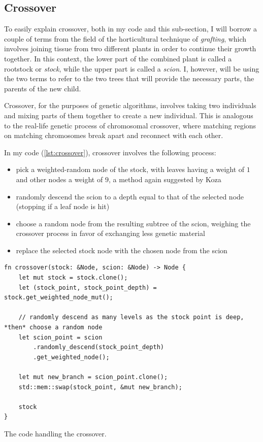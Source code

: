 \documentclass{report}
\newenvironment{code}{\captionsetup{type=listing}}{}
\begin{document}
\subsection{Crossover}

To easily explain crossover, both in my code and this sub-section, I will borrow a couple of terms from the field of the horticultural technique of \emph{grafting}, which involves joining tissue from two different plants in order to continue their growth together. In this context, the lower part of the combined plant is called a rootstock or \emph{stock}, while the upper part is called a \emph{scion}. I, however, will be using the two terms to refer to the two trees that will provide the necessary parts, the parents of the new child.

Crossover, for the purposes of genetic algorithms, involves taking two individuals and mixing parts of them together to create a new individual. This is analogous to the real-life genetic process of chromosomal crossover, where matching regions on matching chromosomes break apart and reconnect with each other.

In my code (\autoref{lst:crossover}), crossover involves the following process:
\begin{itemize}
    \label{weighted_random}
    \item pick a weighted-random node of the stock, with leaves having a weight of $1$ and other nodes a weight of $9$, a method again suggested by Koza\cite{koza}
    \item randomly descend the scion to a depth equal to that of the selected node (stopping if a leaf node is hit)
    \item choose a random node from the resulting subtree of the scion, weighing the crossover process in favor of exchanging less genetic material
    \item replace the selected stock node with the chosen node from the scion
\end{itemize}

\begin{code}
    \begin{verbatim}
fn crossover(stock: &Node, scion: &Node) -> Node {
    let mut stock = stock.clone();
    let (stock_point, stock_point_depth) = stock.get_weighted_node_mut();

    // randomly descend as many levels as the stock point is deep, *then* choose a random node
    let scion_point = scion
        .randomly_descend(stock_point_depth)
        .get_weighted_node();

    let mut new_branch = scion_point.clone();
    std::mem::swap(stock_point, &mut new_branch);

    stock
}
    \end{verbatim}
    \caption{The code handling the crossover.}
    \label{lst:crossover}
\end{code}
\end{document}
